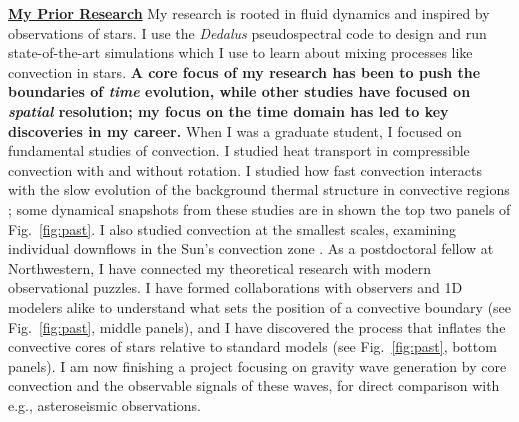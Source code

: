\documentclass[12pt]{article}
\newcommand{\sct}[1]{\vspace{0.3cm}\hspace{-\parindent}\textbf{\underline{#1}}\hspace{0.3cm}}
\begin{document}
\sct{My Prior Research}
My research is rooted in fluid dynamics and inspired by observations of stars.
I use the \emph{Dedalus} \citep{burns_etal_2020} pseudospectral code to design and run state-of-the-art simulations which I use to learn about mixing processes like convection in stars.
\textbf{A core focus of my research has been to push the boundaries of \emph{time} evolution, while other studies have focused on \emph{spatial} resolution; my focus on the time domain has led to key discoveries in my career.}
When I was a graduate student, I focused on fundamental studies of convection.
I studied heat transport in compressible convection with  \citep{anders_etal_2019_rot} and without \citep{anders_brown_2017} rotation.
I studied how fast convection interacts with the slow evolution of the background thermal structure in convective regions \citep{anders_etal_2018,anders_etal_2020}; some dynamical snapshots from these studies are in shown the top two panels of Fig.~\ref{fig:past}.
I also studied convection at the smallest scales, examining individual downflows in the Sun's convection zone \cite{anders_etal_2019_thermals}.
As a postdoctoral fellow at Northwestern, I have connected my theoretical research with modern observational puzzles.
I have formed collaborations with observers and 1D modelers alike to understand what sets the position of a convective boundary \citep{anders_etal_2022b} (see Fig.~\ref{fig:past}, middle panels), and I have discovered the process that inflates the convective cores of stars relative to standard models \citep{anders_etal_2022a} (see Fig.~\ref{fig:past}, bottom panels).
I am now finishing a project focusing on gravity wave generation by core convection and the observable signals of these waves, for direct comparison with e.g., asteroseismic observations.
\end{document}
